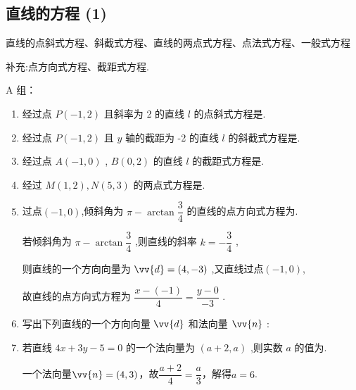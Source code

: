 \subsection*{直线的方程 (1)}

\zsd 直线的点斜式方程、斜截式方程、直线的两点式方程、点法式方程、一般式方程

补充:点方向式方程、截距式方程.

A 组：
\begin{enumerate}
    \item 经过点 $P\left( {-1,2}\right)$ 且斜率为 2 的直线 $l$ 的点斜式方程是.
    
    \item 经过点 $P\left( {-1,2}\right)$ 且 ${y}$ 轴的截距为 -2 的直线 $l$ 的斜截式方程是.
    
    \item 经过点 ${A}\left( {-1,0}\right)$ , ${B}\left( {0,2}\right)$ 的直线 $l$ 的截距式方程是.

    \item 经过 $M\left( {1,2}\right) ,N\left( {5,3}\right)$ 的两点式方程是.

    \item 过点$(-1,0)$,倾斜角为 $\pi  - \arctan \dfrac{3}{4}$ 的直线的点方向式方程为.
    \begin{jieda}
        若倾斜角为 $\pi  - \arctan \dfrac{3}{4}$ ,则直线的斜率 $k =  - \dfrac{3}{4}$ ,

        则直线的一个方向向量为 $\vv{d} = \left( {4, - 3}\right)$ ,又直线过点$(-1,0)$,

        故直线的点方向式方程为 $\dfrac{x - \left( {-1}\right) }{4} = \dfrac{y - 0}{-3}$ .

    \end{jieda}

    \item 写出下列直线的一个方向向量 $\vv{d}$ 和法向量 $\vv{n}$ :
    
    \item 若直线 ${4x} + {3y} - 5 = 0$ 的一个法向量为 $\left( {a + 2,a}\right)$ ,则实数 $a$ 的值为.
    \begin{jieda}
        一个法向量$\vv{n} = (4, 3)$，故$\dfrac{a+2}{4} = \dfrac{a}{3}$，解得$a = 6$.
    \end{jieda}

\end{enumerate}
